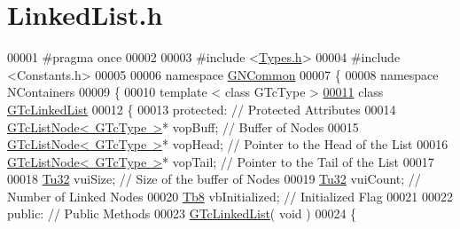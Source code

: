 \hypertarget{_linked_list_8h_source}{}\section{Linked\+List.\+h}
\label{_linked_list_8h_source}

\begin{DoxyCode}
00001 \textcolor{preprocessor}{#pragma once}
00002 
00003 \textcolor{preprocessor}{#include <\mbox{\hyperlink{_types_8h}{Types.h}}>}
00004 \textcolor{preprocessor}{#include <Constants.h>}
00005 
00006 \textcolor{keyword}{namespace }\mbox{\hyperlink{namespace_g_n_common}{GNCommon}}
00007 \{
00008    \textcolor{keyword}{namespace }NContainers
00009    \{
00010       \textcolor{keyword}{template} < \textcolor{keyword}{class} GTcType >
\mbox{\hyperlink{class_g_n_common_1_1_n_containers_1_1_g_tc_linked_list}{00011}}       \textcolor{keyword}{class }\mbox{\hyperlink{class_g_n_common_1_1_n_containers_1_1_g_tc_linked_list}{GTcLinkedList}}
00012       \{
00013       \textcolor{keyword}{protected}:     \textcolor{comment}{// Protected Attributes}
00014          \mbox{\hyperlink{class_g_n_common_1_1_n_containers_1_1_g_tc_list_node}{GTcListNode< GTcType >}}* vopBuff; \textcolor{comment}{// Buffer of Nodes}
00015          \mbox{\hyperlink{class_g_n_common_1_1_n_containers_1_1_g_tc_list_node}{GTcListNode< GTcType >}}* vopHead; \textcolor{comment}{// Pointer to the Head of the List}
00016          \mbox{\hyperlink{class_g_n_common_1_1_n_containers_1_1_g_tc_list_node}{GTcListNode< GTcType >}}* vopTail; \textcolor{comment}{// Pointer to the Tail of the List}
00017 
00018          \mbox{\hyperlink{namespace_g_n_common_a941b527ef318f318aed7903dc832b7e4}{Tu32}} vuiSize;       \textcolor{comment}{// Size of the buffer of Nodes}
00019          \mbox{\hyperlink{namespace_g_n_common_a941b527ef318f318aed7903dc832b7e4}{Tu32}} vuiCount;      \textcolor{comment}{// Number of Linked Nodes}
00020          \mbox{\hyperlink{namespace_g_n_common_a8115dc7ed53b6e5b52e6bfde1632ea74}{Tb8}}  vbInitialized; \textcolor{comment}{// Initialized Flag}
00021 
00022       \textcolor{keyword}{public}:        \textcolor{comment}{// Public Methods}
00023          \mbox{\hyperlink{class_g_n_common_1_1_n_containers_1_1_g_tc_linked_list}{GTcLinkedList}}( \textcolor{keywordtype}{void} )
00024          \{

\end{DoxyCode}
